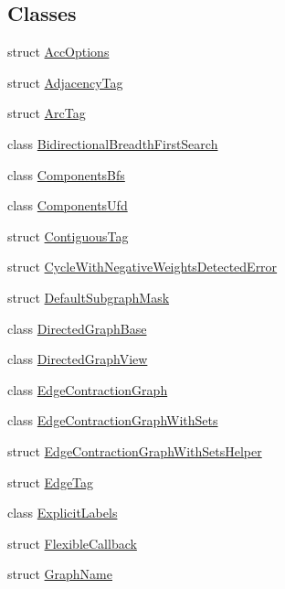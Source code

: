 \subsection*{Classes}
\begin{DoxyCompactItemize}
\item 
struct \hyperlink{structnifty_1_1graph_1_1AccOptions}{Acc\+Options}
\item 
struct \hyperlink{structnifty_1_1graph_1_1AdjacencyTag}{Adjacency\+Tag}
\item 
struct \hyperlink{structnifty_1_1graph_1_1ArcTag}{Arc\+Tag}
\item 
class \hyperlink{classnifty_1_1graph_1_1BidirectionalBreadthFirstSearch}{Bidirectional\+Breadth\+First\+Search}
\item 
class \hyperlink{classnifty_1_1graph_1_1ComponentsBfs}{Components\+Bfs}
\item 
class \hyperlink{classnifty_1_1graph_1_1ComponentsUfd}{Components\+Ufd}
\item 
struct \hyperlink{structnifty_1_1graph_1_1ContiguousTag}{Contiguous\+Tag}
\item 
struct \hyperlink{structnifty_1_1graph_1_1CycleWithNegativeWeightsDetectedError}{Cycle\+With\+Negative\+Weights\+Detected\+Error}
\item 
struct \hyperlink{structnifty_1_1graph_1_1DefaultSubgraphMask}{Default\+Subgraph\+Mask}
\item 
class \hyperlink{classnifty_1_1graph_1_1DirectedGraphBase}{Directed\+Graph\+Base}
\item 
class \hyperlink{classnifty_1_1graph_1_1DirectedGraphView}{Directed\+Graph\+View}
\item 
class \hyperlink{classnifty_1_1graph_1_1EdgeContractionGraph}{Edge\+Contraction\+Graph}
\item 
class \hyperlink{classnifty_1_1graph_1_1EdgeContractionGraphWithSets}{Edge\+Contraction\+Graph\+With\+Sets}
\item 
struct \hyperlink{structnifty_1_1graph_1_1EdgeContractionGraphWithSetsHelper}{Edge\+Contraction\+Graph\+With\+Sets\+Helper}
\item 
struct \hyperlink{structnifty_1_1graph_1_1EdgeTag}{Edge\+Tag}
\item 
class \hyperlink{classnifty_1_1graph_1_1ExplicitLabels}{Explicit\+Labels}
\item 
struct \hyperlink{structnifty_1_1graph_1_1FlexibleCallback}{Flexible\+Callback}
\item 
struct \hyperlink{structnifty_1_1graph_1_1GraphName}{Graph\+Name}

\end{DoxyCompactItemize}
